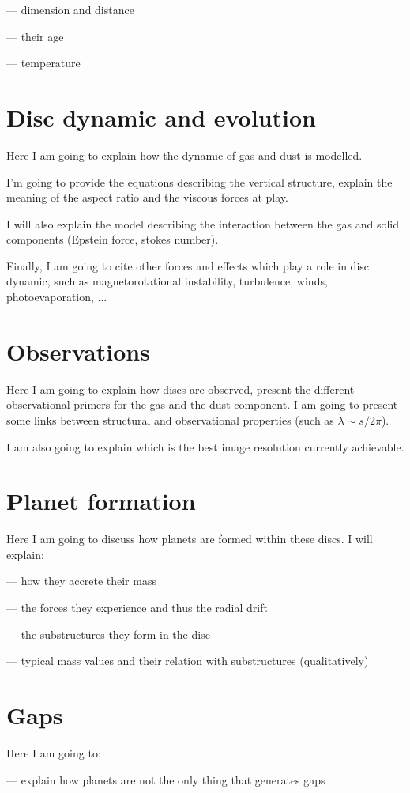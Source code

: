 \documentclass[a4paper,10pt]{report}
\begin{document}
— dimension and distance

— their age

— temperature

\section{Disc dynamic and evolution}
Here I am going to explain how the dynamic of gas and dust is modelled.

I'm going to provide the equations describing the vertical structure, explain
the meaning of the aspect ratio and the viscous forces at play.

I will also explain the model describing the interaction
between the gas and solid components (Epstein force, stokes number).

Finally, I am going to cite other forces and effects which play a role in disc dynamic,
such as magnetorotational instability, turbulence, winds, photoevaporation, ...

\section{Observations}
Here I am going to explain how discs are observed, present the different observational primers 
for the gas and the dust component. I am going to present some links between structural and observational 
properties (such as $\lambda \sim s/2\pi$).

I am also going to explain which is the best image resolution currently achievable.

\section{Planet formation}
Here I am going to discuss how planets are formed within these discs. 
I will explain: 

    — how they accrete their mass

    — the forces they experience and thus the radial drift

    — the substructures they form in the disc

    — typical mass values and their relation with substructures (qualitatively) 

\section{Gaps}
Here I am going to:

— explain how planets are not the only thing that generates gaps
\end{document}
